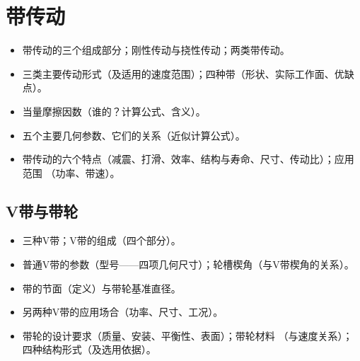 \documentclass[12pt,a4paper]{article}
\newcommand{\tightlist}{\setlength{\parskip}{0pt}\setlength{\itemsep}{0pt}}
\newcommand{\hint}[1]{\textsf{（#1）}}
\newcommand{\minor}[1]{{\color{gray} #1}}
\begin{document}
\section{带传动}
\begin{itemize}\tightlist
    \item 带传动的三个组成部分；刚性传动与挠性传动；两类带传动。
    \item 三类主要传动形式\hint{及适用的速度范围}；四种带\hint{形状、实际工作面、优缺点}。
    \item 当量摩擦因数\hint{谁的？计算公式、含义}。
    \item 五个主要几何参数、它们的关系\hint{近似计算公式}。
    \item 带传动的六个特点\hint{减震、打滑、效率、结构与寿命、尺寸、传动比}；应用范围
    \hint{功率、带速}。
\end{itemize}

\subsection{V带与带轮}
\begin{itemize}\tightlist
    \item 三种V带；V带的组成\hint{四个部分}。
    \item 普通V带的参数\hint{型号——四项几何尺寸}；轮槽楔角\hint{与V带楔角的关系}。
    \item 带的节面\hint{定义}与带轮基准直径。
    \item \minor{另两种V带的应用场合\hint{功率、尺寸、工况}。}
    \item \minor{带轮的设计要求\hint{质量、安装、平衡性、表面}；}带轮材料
    \hint{与速度关系}；\minor{四种结构形式\hint{及选用依据}。}
\end{itemize}
\end{document}
